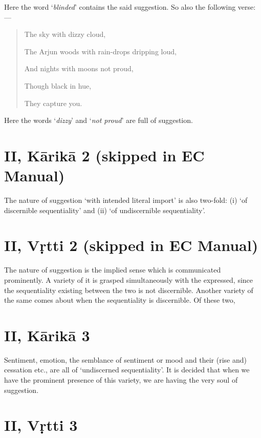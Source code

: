 \documentclass[12pt]{book}
\begin{document}
Here the word `\textit{blinded}' contains the said suggestion. So
also the following verse:---

\begin{quotation}
\begin{em}
The sky with dizzy cloud,

The Arjun woods with rain-drops dripping loud,

And nights with moons not proud,

Though black in hue,

They capture you.
\end{em}
\end{quotation}

Here the words `\textit{dizzy}' and `\textit{not proud}' are full of suggestion.


\section{II, Kārikā 2 (skipped in EC Manual)}

The nature of suggestion `with intended literal import' is
also two-fold: (i) `of discernible sequentiality' and (ii) `of
undiscernible sequentiality'. 


\section{II, Vṛtti 2 (skipped in EC Manual)}

The nature of suggestion is the implied sense which is communicated prominently. A variety of it is grasped simultaneously with
the expressed, since the sequentiality existing between the two is
not discernible. Another variety of the same comes about when
the sequentiality is discernible. Of these two,


\section{II, Kārikā 3}

Sentiment, emotion, the semblance of sentiment or mood
and their (rise and) cessation etc., are all of `undiscerned
sequentiality'. It is decided that when we have the prominent
presence of this variety, we are having the very soul of suggestion.


\section{II, Vṛtti 3}
\end{document}
